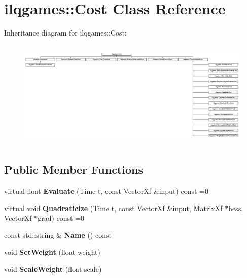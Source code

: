 \hypertarget{classilqgames_1_1_cost}{}\section{ilqgames\+:\+:Cost Class Reference}
\label{classilqgames_1_1_cost}
Inheritance diagram for ilqgames\+:\+:Cost\+:\begin{figure}[H]
\begin{center}
\leavevmode
\includegraphics[height=5.224490cm]{classilqgames_1_1_cost}
\end{center}
\end{figure}
\subsection*{Public Member Functions}
\begin{DoxyCompactItemize}
\item 
virtual float {\bfseries Evaluate} (Time t, const Vector\+Xf \&input) const =0\hypertarget{classilqgames_1_1_cost_a90ad7fc2697f0d8c3392dc5a079e40f9}{}\label{classilqgames_1_1_cost_a90ad7fc2697f0d8c3392dc5a079e40f9}

\item 
virtual void {\bfseries Quadraticize} (Time t, const Vector\+Xf \&input, Matrix\+Xf $\ast$hess, Vector\+Xf $\ast$grad) const =0\hypertarget{classilqgames_1_1_cost_a6857aa0bd5005626cd674d01ee544a74}{}\label{classilqgames_1_1_cost_a6857aa0bd5005626cd674d01ee544a74}

\item 
const std\+::string \& {\bfseries Name} () const \hypertarget{classilqgames_1_1_cost_a7e21af3d7f23aee0d913ad5e2e0292cb}{}\label{classilqgames_1_1_cost_a7e21af3d7f23aee0d913ad5e2e0292cb}

\item 
void {\bfseries Set\+Weight} (float weight)\hypertarget{classilqgames_1_1_cost_a099e8ab748c378007cd63293ba928cae}{}\label{classilqgames_1_1_cost_a099e8ab748c378007cd63293ba928cae}

\item 
void {\bfseries Scale\+Weight} (float scale)\hypertarget{classilqgames_1_1_cost_abcf058c9ca728990f8f5b3c6acf4ead2}{}\label{classilqgames_1_1_cost_abcf058c9ca728990f8f5b3c6acf4ead2}

\end{DoxyCompactItemize}
